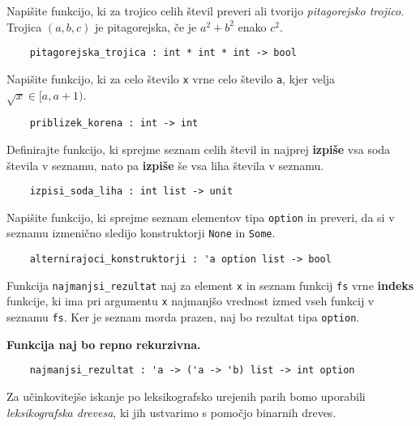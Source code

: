 \documentclass[arhiv]{../izpit}
\begin{document}

\naloga

\podnaloga
Napišite funkcijo, ki za trojico celih števil preveri ali tvorijo \emph{pitagorejsko trojico}. Trojica $(a, b, c)$ je pitagorejska, če je $a^2 + b^2$ enako $c^2$.
\begin{verbatim}
    pitagorejska_trojica : int * int * int -> bool
\end{verbatim}

\podnaloga
Napišite funkcijo, ki za celo število \verb|x| vrne celo število \verb|a|, kjer velja $\sqrt{x} \in [a, a+1)$.
\begin{verbatim}
    priblizek_korena : int -> int
\end{verbatim}

\podnaloga
Definirajte funkcijo, ki sprejme seznam celih števil in najprej \textbf{izpiše} vsa soda števila v seznamu, nato pa \textbf{izpiše} še vsa liha števila v seznamu.
\begin{verbatim}
    izpisi_soda_liha : int list -> unit
\end{verbatim}

\podnaloga
Napišite funkcijo, ki sprejme seznam elementov tipa \verb|option| in preveri, da si v seznamu izmenično sledijo konstruktorji \verb|None| in 
\verb|Some|.
\begin{verbatim}
    alternirajoci_konstruktorji : 'a option list -> bool
\end{verbatim}

\podnaloga
Funkcija \verb|najmanjsi_rezultat| naj za element \verb|x| in seznam funkcij \verb|fs| vrne \textbf{indeks} funkcije, ki ima pri argumentu \verb|x| najmanjšo vrednost izmed vseh funkcij v seznamu \verb|fs|. Ker je seznam morda prazen, naj bo rezultat tipa \verb|option|.

\textbf{Funkcija naj bo repno rekurzivna.}

\begin{verbatim}
    najmanjsi_rezultat : 'a -> ('a -> 'b) list -> int option
\end{verbatim}


\naloga

Za učinkovitejše iskanje po leksikografsko urejenih parih bomo uporabili \emph{leksikografska drevesa}, ki jih ustvarimo s pomočjo binarnih dreves.
\end{document}

